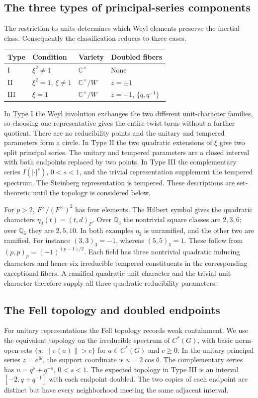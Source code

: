 \subsection{The three types of principal-series components}\label{subsec:three-types}
The restriction to units determines which Weyl elements preserve the inertial class. Consequently the classification reduces to three cases.
\begin{center}\small
\begin{tabularx}{\linewidth}{@{}llXX@{}}\toprule
Type & Condition & Variety & Doubled fibers\\\midrule
I & $\xi^2\ne1$ & $\mathbb C^\times$ & None\\
II & $\xi^2=1,\ \xi\ne1$ & $\mathbb C^\times/W$ & $z=\pm1$\\
III & $\xi=1$ & $\mathbb C^\times/W$ & $z=-1$, $\{q,q^{-1}\}$\\\bottomrule
\end{tabularx}\end{center}
In Type I the Weyl involution exchanges the two different unit-character families, so choosing one representative gives the entire twist torus without a further quotient. There are no reducibility points and the unitary and tempered parameters form a circle. In Type II the two quadratic extensions of $\xi$ give two split principal series. The unitary and tempered parameters are a closed interval with both endpoints replaced by two points. In Type III the complementary series $I(|\cdot|^s)$, $0<s<1$, and the trivial representation supplement the tempered spectrum. The Steinberg representation is tempered. These descriptions are set-theoretic until the topology is considered below.

For $p>2$, $F^\times/(F^\times)^2$ has four elements. The Hilbert symbol gives the quadratic characters $\eta_d(t)=(t,d)_F$. Over $\mathbb Q_3$ the nontrivial square classes are $2,3,6$; over $\mathbb Q_5$ they are $2,5,10$. In both examples $\eta_2$ is unramified, and the other two are ramified. For instance $(3,3)_3=-1$, whereas $(5,5)_5=1$. These follow from $(p,p)_p=(-1)^{(p-1)/2}$. Each field has three nontrivial quadratic inducing characters and hence six irreducible tempered constituents in the corresponding exceptional fibers. A ramified quadratic unit character and the trivial unit character therefore supply all three quadratic reducibility parameters.

\subsection{The Fell topology and doubled endpoints}\label{subsec:fell-model}
For unitary representations the Fell topology records weak containment. We use the equivalent topology on the irreducible spectrum of $C^*(G)$, with basic norm-open sets $\{\pi:\|\pi(a)\|>c\}$ for $a\in C^*(G)$ and $c\ge0$. In the unitary principal series $z=e^{i\theta}$, the support coordinate is $u=2\cos\theta$. The complementary series has $u=q^s+q^{-s}$, $0<s<1$. The expected topology in Type III is an interval $[-2,q+q^{-1}]$ with each endpoint doubled. The two copies of each endpoint are distinct but have every neighborhood meeting the same adjacent interval.

